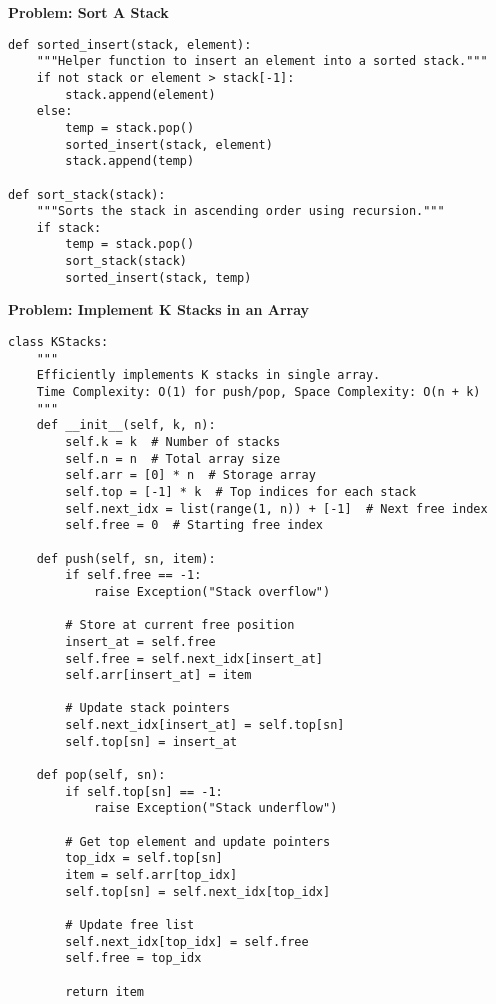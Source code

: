 \noindent\textbf{Problem: Sort A Stack}
\begin{verbatim}
def sorted_insert(stack, element):
    """Helper function to insert an element into a sorted stack."""
    if not stack or element > stack[-1]:
        stack.append(element)
    else:
        temp = stack.pop()
        sorted_insert(stack, element)
        stack.append(temp)

def sort_stack(stack):
    """Sorts the stack in ascending order using recursion."""
    if stack:
        temp = stack.pop()
        sort_stack(stack)
        sorted_insert(stack, temp)
\end{verbatim}
\noindent\textbf{Problem: Implement K Stacks in an Array}
\begin{verbatim}
class KStacks:
    """
    Efficiently implements K stacks in single array.
    Time Complexity: O(1) for push/pop, Space Complexity: O(n + k)
    """
    def __init__(self, k, n):
        self.k = k  # Number of stacks
        self.n = n  # Total array size
        self.arr = [0] * n  # Storage array
        self.top = [-1] * k  # Top indices for each stack
        self.next_idx = list(range(1, n)) + [-1]  # Next free index
        self.free = 0  # Starting free index

    def push(self, sn, item):
        if self.free == -1:
            raise Exception("Stack overflow")
        
        # Store at current free position
        insert_at = self.free
        self.free = self.next_idx[insert_at]
        self.arr[insert_at] = item
        
        # Update stack pointers
        self.next_idx[insert_at] = self.top[sn]
        self.top[sn] = insert_at

    def pop(self, sn):
        if self.top[sn] == -1:
            raise Exception("Stack underflow")
        
        # Get top element and update pointers
        top_idx = self.top[sn]
        item = self.arr[top_idx]
        self.top[sn] = self.next_idx[top_idx]
        
        # Update free list
        self.next_idx[top_idx] = self.free
        self.free = top_idx
        
        return item
\end{verbatim}

